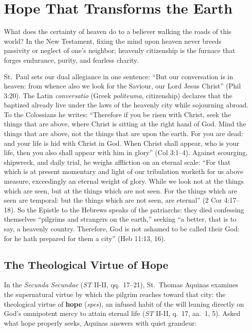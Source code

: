 \section{Hope That Transforms the Earth}

What does the certainty of heaven do to a believer walking the roads of this world? In the New Testament, fixing the mind upon heaven never breeds passivity or neglect of one's neighbor; heavenly citizenship is the furnace that forges endurance, purity, and fearless charity.

St.\ Paul sets our dual allegiance in one sentence: ``But our conversation is in heaven: from whence also we look for the Saviour, our Lord Jesus Christ'' (Phil 3:20). The Latin \textit{conversatio} (Greek \textit{politeuma}, citizenship) declares that the baptized already live under the laws of the heavenly city while sojourning abroad. To the Colossians he writes: ``Therefore if you be risen with Christ, seek the things that are above, where Christ is sitting at the right hand of God. Mind the things that are above, not the things that are upon the earth. For you are dead: and your life is hid with Christ in God. When Christ shall appear, who is your life, then you also shall appear with him in glory'' (Col 3:1--4). Against scourging, shipwreck, and daily trial, he weighs affliction on an eternal scale: ``For that which is at present momentary and light of our tribulation worketh for us above measure, exceedingly an eternal weight of glory. While we look not at the things which are seen, but at the things which are not seen. For the things which are seen are temporal: but the things which are not seen, are eternal'' (2 Cor 4:17--18). So the Epistle to the Hebrews speaks of the patriarchs: they died confessing themselves ``pilgrims and strangers on the earth,'' seeking ``a better, that is to say, a heavenly country. Therefore, God is not ashamed to be called their God: for he hath prepared for them a city'' (Heb 11:13, 16).

\subsection*{The Theological Virtue of Hope}

In the \textit{Secunda Secundae} (\textit{ST} II-II, qq.\ 17--21), St.\ Thomas Aquinas examines the supernatural virtue by which the pilgrim reaches toward that city: the theological virtue of \textbf{hope} (\textit{spes}), an infused habit of the will leaning directly on God's omnipotent mercy to attain eternal life (\textit{ST} II-II, q.\ 17, aa.\ 1, 5). Asked what hope properly seeks, Aquinas answers with quiet grandeur:

